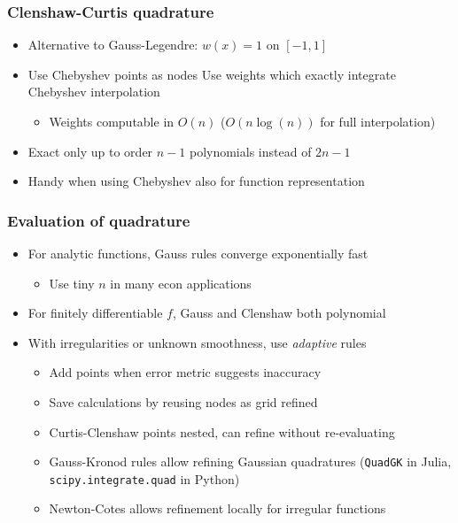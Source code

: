 \documentclass[bigger,handout]{beamer}
\begin{document}
\begin{frame}%

\frametitle{Clenshaw-Curtis quadrature}

\begin{itemize}
\item Alternative to Gauss-Legendre: $w(x)=1$ on $[-1,1]$ 
\item Use Chebyshev points as nodes \newline 
Use weights which exactly integrate Chebyshev interpolation
\begin{itemize}
\item Weights computable in $O(n)$ ($O(n \log(n))$ for full interpolation) 
\end{itemize}
\item Exact only up to order $n-1$ polynomials instead of $2n-1$
\item Handy when using Chebyshev also for function representation
\end{itemize}


\end{frame}%

\begin{frame}%

\frametitle{Evaluation of quadrature}

\begin{itemize}
\item For analytic functions, Gauss rules converge exponentially fast
\begin{itemize}
\item Use tiny $n$ in many econ applications
\end{itemize}
\item For finitely differentiable $f$, Gauss and Clenshaw both polynomial
\item With irregularities or unknown smoothness, use \emph{adaptive} rules
\begin{itemize}
\item Add points when error metric suggests inaccuracy
\item Save calculations by reusing nodes as grid refined
\item Curtis-Clenshaw points nested, can refine without re-evaluating
\item Gauss-Kronod rules allow refining Gaussian quadratures (\texttt{QuadGK} in Julia, \texttt{scipy.integrate.quad} in Python)
\item Newton-Cotes allows refinement locally for irregular functions
\end{itemize}

\end{itemize}


\end{frame}%
\end{document}
